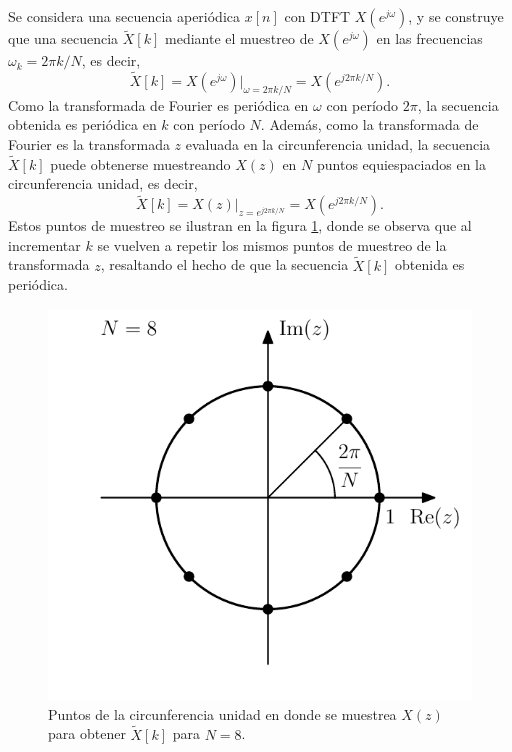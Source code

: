 \documentclass[a4paper]{report}
\begin{document}
Se considera una secuencia aperiódica \(x[n]\) con DTFT \(X(e^{j\omega})\), y se construye que una secuencia \(\tilde{X}[k]\) mediante el muestreo de \(X(e^{j\omega})\) en las frecuencias \(\omega_k=2\pi k/N\), es decir,
\begin{equation}\label{eq:dft_dtft_sampling_Xk}
 \tilde{X}[k]=X(e^{j\omega})\Big|_{\omega=2\pi k/N}=X(e^{j2\pi k/N}). 
\end{equation}
Como la transformada de Fourier es periódica en \(\omega\) con período \(2\pi\), la secuencia obtenida es periódica en \(k\) con período \(N\). Además, como la transformada de Fourier es la transformada \(z\) evaluada en la circunferencia unidad, la secuencia \(\tilde{X}[k]\) puede obtenerse muestreando \(X(z)\) en \(N\) puntos equiespaciados en la circunferencia unidad, es decir,
\[
 \tilde{X}[k]=X(z)\Big|_{z=e^{j2\pi k/N}}=X(e^{j2\pi k/N}).
\]
Estos puntos de muestreo se ilustran en la figura \ref{fig:dft_dtft_sampling_z_plane}, donde se observa que al incrementar \(k\) se vuelven a repetir los mismos puntos de muestreo de la transformada \(z\), resaltando el hecho de que la secuencia \(\tilde{X}[k]\) obtenida es periódica.
\begin{figure}[!htb]
  \begin{minipage}[c]{0.45\textwidth}
    \includegraphics[width=\textwidth]{figuras/dft_dtft_sampling_z_plane.pdf}
  \end{minipage}\hfill
  \begin{minipage}[c]{0.45\textwidth}
    \caption{
      Puntos de la circunferencia unidad en donde se muestrea \(X(z)\) para obtener \(\tilde{X}[k]\) para \(N=8\).
    }\label{fig:dft_dtft_sampling_z_plane}
  \end{minipage}
\end{figure}
\end{document}
